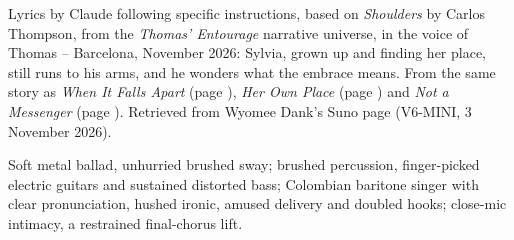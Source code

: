 
\label{sec:mis-brazos-no-a-mi}
\begin{notes}
Lyrics by Claude following specific instructions, based on \emph{Shoulders} by Carlos Thompson, from the \emph{Thomas' Entourage} narrative universe, in the voice of Thomas -- Barcelona, November 2026: Sylvia, grown up and finding her place, still runs to his arms, and he wonders what the embrace means. From the same story as \emph{When It Falls Apart} (page \pageref{sec:when-it-falls-apart}), \emph{Her Own Place} (page \pageref{sec:her-own-place}) and \emph{Not a Messenger} (page \pageref{sec:not-a-messenger}). Retrieved from Wyomee Dank's Suno page (V6-MINI, 3 November 2026).
\end{notes}
\begin{style}
Soft metal ballad, unhurried brushed sway; brushed percussion, finger-picked electric guitars and sustained distorted bass; Colombian baritone singer with clear pronunciation, hushed ironic, amused delivery and doubled hooks; close-mic intimacy, a restrained final-chorus lift.
\end{style}
